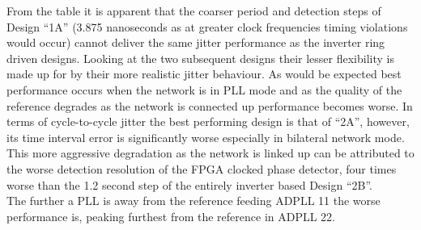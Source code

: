 \documentclass[conference]{IEEEtran}
\begin{document}
From the table it is apparent that the coarser period and detection steps of Design ``1A''  (3.875 nanoseconds as at greater clock frequencies timing violations would occur) cannot deliver the same jitter performance as the inverter ring driven designs. Looking at the two subsequent designs their lesser flexibility is made up for by their more realistic jitter behaviour. As would be expected best performance occurs when the network is in PLL mode and as the quality of the reference degrades as the network is connected up performance becomes worse. In terms of cycle-to-cycle jitter the best performing design is that of ``2A'', however, its time interval error is significantly worse especially in bilateral network mode. This more aggressive degradation as the network is linked up can be attributed to the worse detection resolution of the FPGA clocked phase detector, four times worse than the 1.2 second step of the entirely inverter based Design ``2B''.\\
The further a PLL is away from the reference feeding ADPLL 11 the worse performance is, peaking furthest from the reference in ADPLL 22.
\end{document}
